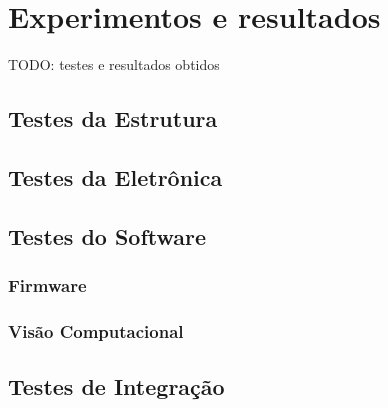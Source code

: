 \chapter{Experimentos e resultados}


TODO: testes e resultados obtidos

\section{Testes da Estrutura}

\section{Testes da Eletrônica}

\section{Testes do Software}

\subsection{Firmware}

\subsection{Visão Computacional}

\section{Testes de Integração}